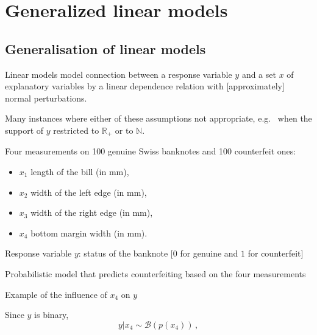 \section{Generalized linear models}
\begin{slide}
\tableofcontents[sectionstyle=show/hide,subsectionstyle=show/shaded/hide]

\end{slide}
\subsection{Generalisation of linear models}
\begin{slide}

Linear models model connection between a response variable $y$ and a set $x$ of explanatory
variables by a linear dependence relation with [approximately] normal perturbations. 

\pause
\vs Many instances where either of these assumptions not appropriate, e.g.~ when the support of $y$
restricted to $\mathbb{R}_+$ or to $\mathbb{N}$.

\end{slide}\begin{slide}

Four measurements on 100 genuine Swiss banknotes and 100 counterfeit ones:
\begin{itemize}
\item[] $x_1$ length of the bill (in mm),
\item[] $x_2$ width of the left edge (in mm),
\item[] $x_3$ width of the right edge (in mm),
\item[] $x_4$ bottom margin width (in mm).
\end{itemize}

Response variable $y$: status of the banknote [$0$ for genuine and $1$ 
for counterfeit] 

\pause\vs
Probabilistic model that predicts counterfeiting based on the four measurements

\end{slide}\begin{slide}

Example of the influence of $x_4$ on $y$

Since  $y$ is binary, 
$$
y|x_4 \sim \mathscr{B}(p(x_4))\,,
$$


\end{slide}
